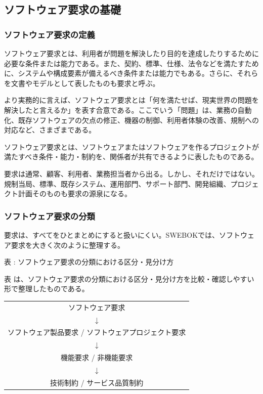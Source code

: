 \subsection{ソフトウェア要求の基礎}

\subsubsection{ソフトウェア要求の定義}

ソフトウェア要求とは、利用者が問題を解決したり目的を達成したりするために必要な条件または能力である。また、契約、標準、仕様、法令などを満たすために、システムや構成要素が備えるべき条件または能力でもある。さらに、それらを文書やモデルとして表したものも要求と呼ぶ。

より実務的に言えば、ソフトウェア要求とは「何を満たせば、現実世界の問題を解決したと言えるか」を表す合意である。ここでいう「問題」は、業務の自動化、既存ソフトウェアの欠点の修正、機器の制御、利用者体験の改善、規制への対応など、さまざまである。

\begin{definitionbox}ソフトウェア要求とは、ソフトウェアまたはソフトウェアを作るプロジェクトが満たすべき条件・能力・制約を、関係者が共有できるように表したものである。\end{definitionbox}

要求は通常、顧客、利用者、業務担当者から出る。しかし、それだけではない。規制当局、標準、既存システム、運用部門、サポート部門、開発組織、プロジェクト計画そのものも要求の源泉になる。

\subsubsection{ソフトウェア要求の分類}

要求は、すべてをひとまとめにすると扱いにくい。SWEBOKでは、ソフトウェア要求を大きく次のように整理する。

\begin{center}
\footnotesize
\par\smallskip\noindent{}\label{tab:ch01-02}表 \thetable: ソフトウェア要求の分類における区分・見分け方\par\smallskip
表 \thetable は、ソフトウェア要求の分類における区分・見分け方を比較・確認しやすい形で整理したものである。\par\smallskip
\begin{tabular}{c}
ソフトウェア要求 \\
$\downarrow$ \\
ソフトウェア製品要求 \quad / \quad ソフトウェアプロジェクト要求 \\
$\downarrow$ \\
機能要求 \quad / \quad 非機能要求 \\
$\downarrow$ \\
技術制約 \quad / \quad サービス品質制約
\end{tabular}
\end{center}

